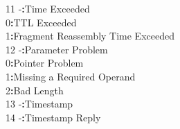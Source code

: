 \documentclass[a4paper,12pt]{article}
\begin{document}
\begin{figure}[H]
			\hspace{6.7mm}11 \hspace{2mm}			-\hspace{8.9mm}\textbf{:}\hspace{2.4mm}Time Exceeded\\
			\hspace{8.7mm} \hspace{3.6mm}			0\hspace{8.8mm}\textbf{:}\hspace{2.2mm}TTL Exceeded\\
			\hspace{8.7mm} \hspace{3.6mm}			1\hspace{8.8mm}\textbf{:}\hspace{2.2mm}Fragment Reassembly Time Exceeded\\
			
			\hspace{6.7mm}12 \hspace{2mm}			-\hspace{8.9mm}\textbf{:}\hspace{2.4mm}Parameter Problem\\
			\hspace{8.7mm} \hspace{3.6mm}			0\hspace{8.8mm}\textbf{:}\hspace{2.2mm}Pointer Problem\\
			\hspace{8.7mm} \hspace{3.6mm}			1\hspace{8.8mm}\textbf{:}\hspace{2.2mm}Missing a Required Operand\\
			\hspace{8.7mm} \hspace{3.6mm}			2\hspace{8.8mm}\textbf{:}\hspace{2.2mm}Bad Length\\
			
			\hspace{6.7mm}13 \hspace{2mm}			-\hspace{8.9mm}\textbf{:}\hspace{2.4mm}Timestamp\\
			
			\hspace{6.7mm}14 \hspace{2mm}			-\hspace{8.9mm}\textbf{:}\hspace{2.4mm}Timestamp Reply\\
						

\end{figure}
\end{document}
